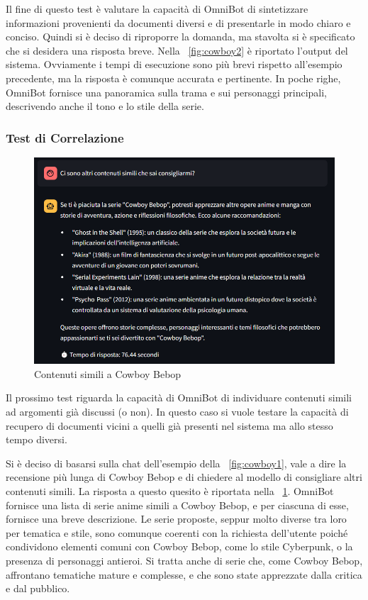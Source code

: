 Il fine di questo test è valutare la capacità di OmniBot di sintetizzare informazioni provenienti da documenti diversi e di presentarle in modo chiaro e conciso. Quindi si è deciso di riproporre la domanda, ma stavolta si è specificato che si desidera una risposta breve.
Nella \figurename{~\ref{fig:cowboy2}} è riportato l'output del sistema. Ovviamente i tempi di esecuzione sono più brevi rispetto all'esempio precedente, ma la risposta è comunque accurata e pertinente. In poche righe, OmniBot fornisce una panoramica sulla trama e sui personaggi principali, descrivendo anche il tono e lo stile della serie.

\subsubsection{Test di Correlazione}
\begin{figure}[!t]
    \centering
    \includegraphics[width=\textwidth]{Images/cap5/cowboy_bebop_followup.PNG}
    \caption{Contenuti simili a Cowboy Bebop}
    \label{fig:cowboy3}
\end{figure}
Il prossimo test riguarda la capacità di OmniBot di individuare contenuti simili ad argomenti già discussi (o non). In questo caso si vuole testare la capacità di recupero di documenti vicini a quelli già presenti nel sistema ma allo stesso tempo diversi.

Si è deciso di basarsi sulla chat dell'esempio della \figurename{~\ref{fig:cowboy1}}, vale a dire la recensione più lunga di Cowboy Bebop e di chiedere al modello di consigliare altri contenuti simili. La risposta a questo quesito è riportata nella \figurename{~\ref{fig:cowboy3}}. OmniBot fornisce una lista di serie anime simili a Cowboy Bebop, e per ciascuna di esse, fornisce una breve descrizione. Le serie proposte, seppur molto diverse tra loro per tematica e stile, sono comunque coerenti con la richiesta dell'utente poiché condividono elementi comuni con Cowboy Bebop, come lo stile Cyberpunk, o la presenza di personaggi antieroi. Si tratta anche di serie che, come Cowboy Bebop, affrontano tematiche mature e complesse, e che sono state apprezzate dalla critica e dal pubblico.

